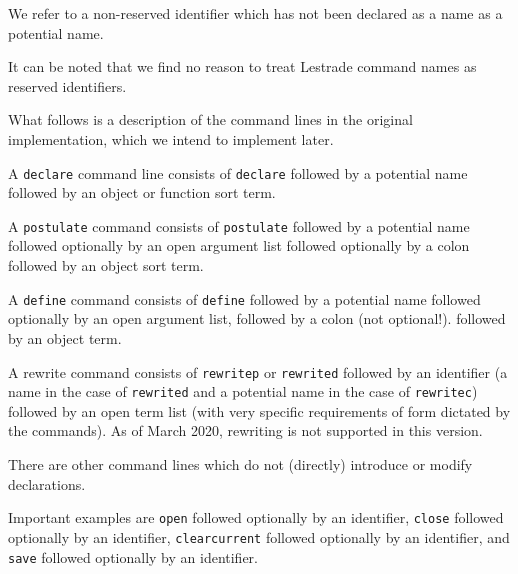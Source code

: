 \documentclass[12pt]{article}
\begin{document}
We refer to a non-reserved identifier which has not been declared as a name as a potential name.

It can be noted that we find no reason to treat Lestrade command names as reserved identifiers.

What follows is a description of the command lines in the original implementation, which we intend to implement later.

A {\tt declare} command line consists of {\tt declare} followed by a potential name followed by an object or function sort term.

A {\tt postulate} command consists of {\tt postulate} followed by a potential name followed optionally by an open argument list followed optionally by a colon followed by an object sort term.

A {\tt define} command consists of {\tt define} followed by a potential name followed optionally by an open argument list, followed by a colon (not optional!). followed by an object term.

A rewrite command consists of {\tt rewritep} or {\tt rewrited} followed by an identifier (a name in the case of {\tt rewrited} and a potential name in the case of {\tt rewritec}) followed by
an open term list (with very specific requirements of form dictated by the commands).  As of March 2020, rewriting is not supported in this version.

There are other command lines which do not (directly) introduce or modify declarations.

Important examples are {\tt open} followed optionally by an identifier, {\tt close} followed optionally by an identifier, {\tt clearcurrent} followed optionally by an identifier, and
{\tt save} followed optionally by an identifier.
\end{document}
